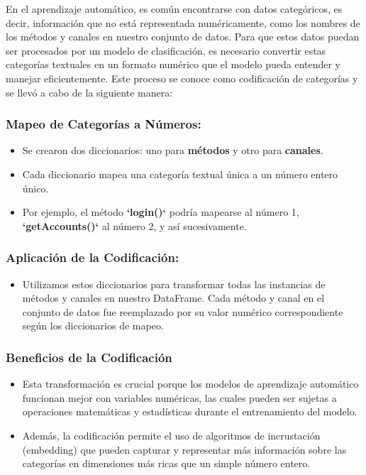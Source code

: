 En el aprendizaje automático, es común encontrarse con datos categóricos, es decir, información que no está representada numéricamente, como los nombres de los métodos y canales en nuestro conjunto de datos. Para que estos datos puedan ser procesados por un modelo de clasificación, es necesario convertir estas categorías textuales en un formato numérico que el modelo pueda entender y manejar eficientemente. Este proceso se conoce como codificación de categorías y se llevó a cabo de la siguiente manera:

\subsubsection{Mapeo de Categorías a Números:}

\begin{itemize}
    \item Se crearon dos diccionarios: uno para \textbf{métodos} y otro para \textbf{canales}.
    \item Cada diccionario mapea una categoría textual única a un número entero único.
    \item Por ejemplo, el método \textbf{`login()`} podría mapearse al número 1, \textbf{`getAccounts()`} al número 2, y así sucesivamente.
\end{itemize}

\subsubsection{Aplicación de la Codificación:}

\begin{itemize}
    \item Utilizamos estos diccionarios para transformar todas las instancias de métodos y canales en nuestro DataFrame. Cada método y canal en el conjunto de datos fue reemplazado por su valor numérico correspondiente según los diccionarios de mapeo.
\end{itemize}

\subsubsection{Beneficios de la Codificación}

\begin{itemize}
    \item Esta transformación es crucial porque los modelos de aprendizaje automático funcionan mejor con variables numéricas, las cuales pueden ser sujetas a operaciones matemáticas y estadísticas durante el entrenamiento del modelo.
    \item Además, la codificación permite el uso de algoritmos de incrustación (embedding) que pueden capturar y representar más información sobre las categorías en dimensiones más ricas que un simple número entero.
\end{itemize}

